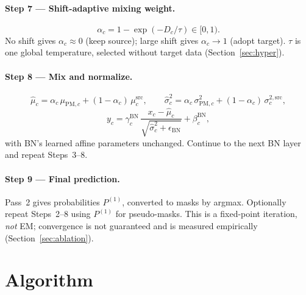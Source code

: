 \documentclass[11pt,a4paper]{article}
\newcommand{\src}{\mathrm{src}}
\newcommand{\PM}{\mathrm{PM}}
\begin{document}
\paragraph{Step 7 --- Shift-adaptive mixing weight.}
\begin{equation}
\alpha_c = 1 - \exp\!\left(-D_c/\tau\right) \in [0,1).
\end{equation}
No shift gives $\alpha_c\approx 0$ (keep source); large shift gives $\alpha_c\to1$ (adopt target). $\tau$ is one global temperature, selected without target data (Section~\ref{sec:hyper}).

\paragraph{Step 8 --- Mix and normalize.}
\begin{equation}
\hat\mu_c = \alpha_c\,\mu_{\PM,c} + (1-\alpha_c)\,\mu^{\src}_c, \qquad
\hat\sigma^2_c = \alpha_c\,\sigma^2_{\PM,c} + (1-\alpha_c)\,\sigma^{2,\src}_c ,
\end{equation}
\begin{equation}
y_c = \gamma^{\mathrm{BN}}_c\,\frac{x_c-\hat\mu_c}{\sqrt{\hat\sigma^2_c+\epsilon_{\mathrm{BN}}}} + \beta^{\mathrm{BN}}_c ,
\end{equation}
with BN's learned affine parameters unchanged. Continue to the next BN layer and repeat Steps~3--8.

\paragraph{Step 9 --- Final prediction.}
Pass~2 gives probabilities $P^{(1)}$, converted to masks by argmax. Optionally repeat Steps~2--8 using $P^{(1)}$ for pseudo-masks. This is a fixed-point iteration, \emph{not} EM; convergence is not guaranteed and is measured empirically (Section~\ref{sec:ablation}).

\section{Algorithm}
\end{document}
